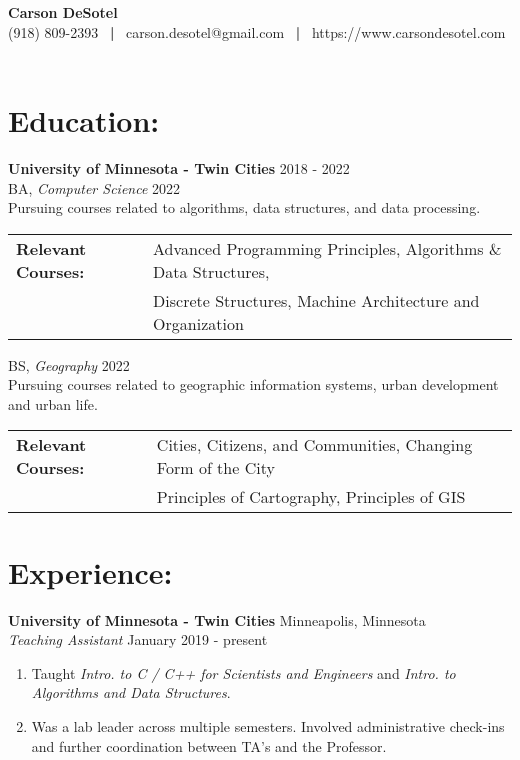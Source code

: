 \documentclass[10pt]{article}
\begin{document}
	\begin{center}
		{\LARGE \textbf{Carson DeSotel}} \\
		\vspace{5pt} 		%
		(918) 809-2393 \ \textbf{|} \
		carson.desotel@gmail.com \ \textbf{|} \
		https://www.carsondesotel.com \
		
	\end{center}
		
	\section*{Education: \hrulefill} 
		\textbf{University of Minnesota - Twin Cities} \hfill 2018 - 2022 \\
		\indent BA, \textit{Computer Science} \hfill 2022 \\
		\indent \indent Pursuing courses related to algorithms, data structures, and data processing. \\
		\indent \indent 
		\begin{tabular}{@{}l@{\ }l}
		\textbf{Relevant Courses: } & Advanced Programming Principles, Algorithms \& Data Structures, \\ & Discrete Structures, Machine Architecture and Organization \\
		\end{tabular}
		
		\vspace{5pt}
		
		\indent BS, \textit{Geography} \hfill 2022 \\
		\indent \indent Pursuing courses related to geographic information systems,  urban development and urban life. \\
		\indent \indent
		\begin{tabular}{@{}l@{\ }l}
		\textbf{Relevant Courses: } & Cities, Citizens, and Communities, Changing Form of the City \\ & Principles of Cartography, Principles of GIS
		\end{tabular}
			
	\section*{Experience: \hrulefill}
		\textbf{University of Minnesota - Twin Cities} \hfill Minneapolis, Minnesota \\
		\textit{Teaching Assistant} \hfill January 2019 - present 
		\begin{enumerate}[label=--]
			\item Taught \textit{Intro. to C / C++ for Scientists and Engineers} and \textit{Intro. to Algorithms and Data Structures}.
			\item Was a lab leader across multiple semesters. Involved administrative check-ins and further coordination between TA's and the Professor.
		\end{enumerate}
		
\end{document}
